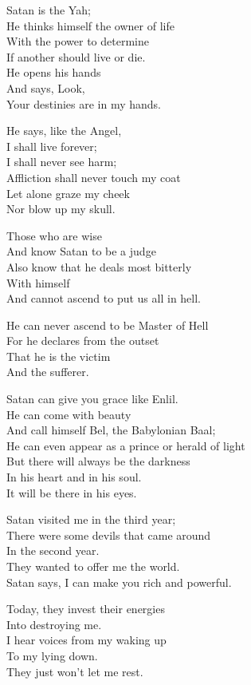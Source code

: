 \documentclass[
]{book}
\begin{document}
Satan is the Yah;\\
He thinks himself the owner of life\\
With the power to determine\\
If another should live or die.\\
He opens his hands\\
And says, Look,\\
Your destinies are in my hands.

He says, like the Angel,\\
I shall live forever;\\
I shall never see harm;\\
Affliction shall never touch my coat\\
Let alone graze my cheek\\
Nor blow up my skull.

Those who are wise\\
And know Satan to be a judge\\
Also know that he deals most bitterly\\
With himself\\
And cannot ascend to put us all in hell.

He can never ascend to be Master of Hell\\
For he declares from the outset\\
That he is the victim\\
And the sufferer.

Satan can give you grace like Enlil.\\
He can come with beauty\\
And call himself Bel, the Babylonian Baal;\\
He can even appear as a prince or herald of light\\
But there will always be the darkness\\
In his heart and in his soul.\\
It will be there in his eyes.

Satan visited me in the third year;\\
There were some devils that came around\\
In the second year.\\
They wanted to offer me the world.\\
Satan says, I can make you rich and powerful.

Today, they invest their energies\\
Into destroying me.\\
I hear voices from my waking up\\
To my lying down.\\
They just won't let me rest.
\end{document}
